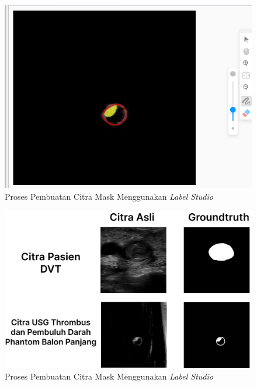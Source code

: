 {\begin{figure}[htbp]
	\centering
	\includegraphics[scale= 0.25]{bab3/label-studio.png}
	\caption{Proses Pembuatan Citra Mask Menggunakan \textit{Label Studio}}
	\label{fig:label-studio}
\end{figure}

\begin{figure}[htbp]
	\centering
	\includegraphics[scale= 0.15]{bab3/Hasil-Label.png}
	\caption{Proses Pembuatan Citra Mask Menggunakan \textit{Label Studio}}
	\label{fig:result-label}
\end{figure}

}
